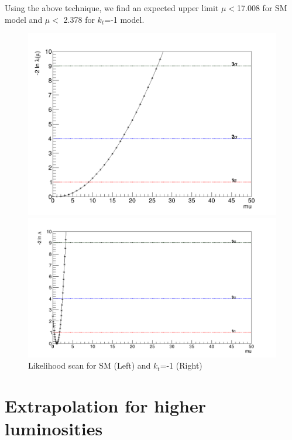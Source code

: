 Using the above technique, we find an expected upper limit $\mu < $17.008 for SM model and $\mu < $ 2.378 for $k_t$=-1 model.


\begin{figure}[!htbp]
	\centering
	\begin{minipage}[b]{0.48\textwidth}
		\includegraphics[width=\textwidth]{Chapter4/Likelihood.png}
	\end{minipage}
	\hfill
	\begin{minipage}[b]{0.48\textwidth}
		\includegraphics[width=\textwidth]{Chapter4/Likelihood-kt-1.png}
	\end{minipage}
	\caption{Likelihood scan for SM (Left) and $k_t$=-1 (Right)}
	\label{scanl}
\end{figure}


\section{Extrapolation for higher luminosities}


